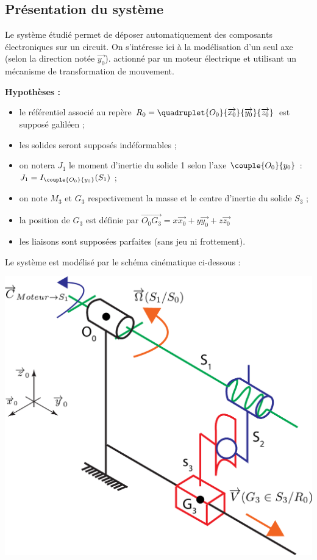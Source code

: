 
\setcounter{exo}{0}



\ifprof
\else
\begin{multicols}{2}
\fi


\section*{Présentation du système}
\ifprof
\else
Le système étudié permet de déposer automatiquement des composants électroniques sur un circuit.
On s'intéresse ici à la modélisation d'un seul axe (selon la direction notée $\overrightarrow{y_0}$). actionné par un moteur électrique et utilisant un mécanisme de transformation de mouvement.
%
%


\textbf{Hypothèses :}
\begin{itemize}
\item le référentiel associé au repère $R_0=\quadruplet{O_0}{\overrightarrow{x_0}}{\overrightarrow{y_0}}{\overrightarrow{z_0}}$ est supposé galiléen ;
\item les solides seront supposés indéformables ; 
\item on notera $J_1$ le moment d'inertie du solide 1 selon l'axe $\couple{O_0}{y_0}$ : $J_1=I_{\couple{O_0}{y_0}}(S_1)$ ;
\item on note $M_3$ et $G_3$ respectivement la masse et le centre d'inertie du solide $S_3$ ;
\item la position de $G_3$ est définie par $\overrightarrow{O_0G_3}=x\overrightarrow{x_0}+y \overrightarrow{y_0}+z \overrightarrow{z_0}$
\item les liaisons sont supposées parfaites (sans jeu ni frottement).
\end{itemize}

Le système est modélisé par le schéma cinématique ci-dessous :
\begin{center}
\includegraphics[width=0.6\linewidth]{images/schema_cine_depose_composant.pdf}
\end{center}


\end{multicols}
